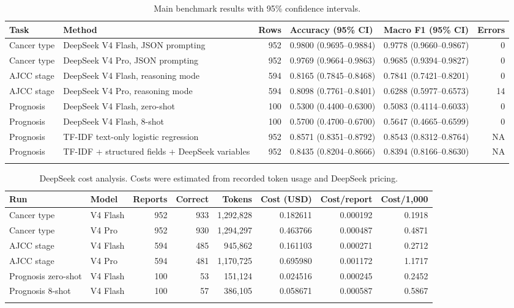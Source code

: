 \documentclass[pdflatex,sn-vancouver-num]{sn-jnl}
\begin{document}
\begin{table}[htbp]
\caption{Main benchmark results with 95\% confidence intervals.}\label{tab:main}
\small
\begin{tabular}{@{}p{1.8cm}p{5.0cm}r p{3.0cm} p{3.0cm} r@{}}
\toprule
Task & Method & Rows & Accuracy (95\% CI) & Macro F1 (95\% CI) & Errors \\
\midrule
Cancer type & DeepSeek V4 Flash, JSON prompting & 952 & 0.9800 (0.9695--0.9884) & 0.9778 (0.9660--0.9867) & 0 \\
Cancer type & DeepSeek V4 Pro, JSON prompting & 952 & 0.9769 (0.9664--0.9863) & 0.9685 (0.9394--0.9827) & 0 \\
AJCC stage & DeepSeek V4 Flash, reasoning mode & 594 & 0.8165 (0.7845--0.8468) & 0.7841 (0.7421--0.8201) & 0 \\
AJCC stage & DeepSeek V4 Pro, reasoning mode & 594 & 0.8098 (0.7761--0.8401) & 0.6288 (0.5977--0.6573) & 14 \\
Prognosis & DeepSeek V4 Flash, zero-shot & 100 & 0.5300 (0.4400--0.6300) & 0.5083 (0.4114--0.6033) & 0 \\
Prognosis & DeepSeek V4 Flash, 8-shot & 100 & 0.5700 (0.4700--0.6700) & 0.5647 (0.4665--0.6599) & 0 \\
Prognosis & TF-IDF text-only logistic regression & 952 & 0.8571 (0.8351--0.8792) & 0.8543 (0.8312--0.8764) & NA \\
Prognosis & TF-IDF + structured fields + DeepSeek variables & 952 & 0.8435 (0.8204--0.8666) & 0.8394 (0.8166--0.8630) & NA \\
\botrule
\end{tabular}
\end{table}

\begin{table}[htbp]
\caption{DeepSeek cost analysis. Costs were estimated from recorded token usage and DeepSeek pricing.}\label{tab:cost}
\scriptsize
\begin{tabular}{@{}p{2.4cm}p{2.2cm}r r r r r r@{}}
\toprule
Run & Model & Reports & Correct & Tokens & Cost (USD) & Cost/report & Cost/1,000 \\
\midrule
Cancer type & V4 Flash & 952 & 933 & 1,292,828 & 0.182611 & 0.000192 & 0.1918 \\
Cancer type & V4 Pro & 952 & 930 & 1,294,297 & 0.463766 & 0.000487 & 0.4871 \\
AJCC stage & V4 Flash & 594 & 485 & 945,862 & 0.161103 & 0.000271 & 0.2712 \\
AJCC stage & V4 Pro & 594 & 481 & 1,170,725 & 0.695980 & 0.001172 & 1.1717 \\
Prognosis zero-shot & V4 Flash & 100 & 53 & 151,124 & 0.024516 & 0.000245 & 0.2452 \\
Prognosis 8-shot & V4 Flash & 100 & 57 & 386,105 & 0.058671 & 0.000587 & 0.5867 \\
\botrule
\end{tabular}
\end{table}
\end{document}
